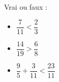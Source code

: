 \documentclass{automatisme}
\begin{document}
\begin{frame}
	Vrai ou faux :

	\begin{multicols}{3}
		\begin{itemize}
			\item $\dfrac{7}{11} < \dfrac{2}{3}$

			\item $\dfrac{14}{19} > \dfrac{6}{8}$

			\item $\dfrac{9}{5} + \dfrac{3}{11} < \dfrac{23}{11}$

		\end{itemize}
	\end{multicols}
\end{frame}
\end{document}
